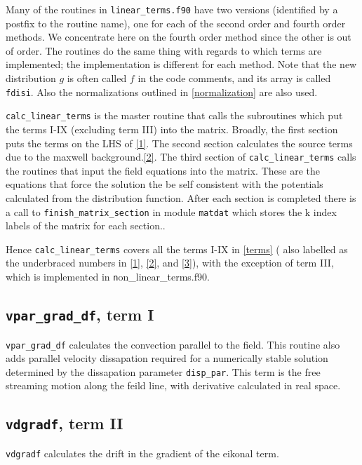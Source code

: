 \documentclass{report}
\begin{document}
\par
Many of the routines in \texttt {linear\_terms.f90} have two versions (identified by a postfix to the routine name), one for each of the second order and fourth order methods.  We concentrate here on the fourth order method since the other is out of order. The routines do the same thing with regards to which terms are implemented; the implementation is different for each method.  Note that the new distribution $g$ is often called $f$ in the code comments, and its array is called \texttt{fdisi}. Also the normalizations outlined in \ref{normalization} are also used.

\par
\texttt{calc\_linear\_terms} is the master routine that calls the subroutines which put the terms I-IX (excluding term III) into the matrix.  Broadly, the first section puts the terms on the LHS of \ref{1}.  The second section calculates the source terms due to the maxwell background.\ref{2}.  The third section of \texttt{calc\_linear\_terms} calls the routines that input the field equations into the matrix. These are the equations that force the solution the be self consistent with the potentials calculated from the distribution function.  After each section is completed there is a call to \texttt {finish\_matrix\_section} in module \texttt {matdat} which stores the k index labels of the matrix for each section..

\par
Hence \texttt{calc\_linear\_terms} covers all the terms I-IX in \ref{terms} ( also labelled as the underbraced numbers in \ref{1}, \ref{2}, and \ref{3}), with the exception of term III, which is implemented in {\texttt non\_linear\_terms.f90}.

\subsection{\texttt{vpar\_grad\_df}, term I}
\texttt{vpar\_grad\_df} calculates the convection parallel to the field.  This routine also adds parallel velocity dissapation required for a numerically stable solution determined by the dissapation parameter \texttt{disp\_par}.  This term is the free streaming motion along the feild line, with derivative calculated in real space.

\subsection{\texttt{vdgradf}, term II}
\texttt{vdgradf} calculates the drift in the gradient of the eikonal term.
\end{document}
